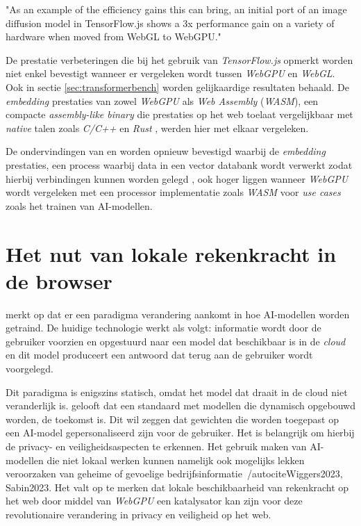 \begin{displayquote}
    "As an example of the efficiency gains this can bring, an initial port of an image diffusion model in TensorFlow.js shows a 3x performance gain on a variety of hardware when moved from WebGL to WebGPU."
\end{displayquote}

De prestatie verbeteringen die \textcite{Wallez2023} bij het gebruik van \textit{TensorFlow.js} opmerkt worden niet enkel bevestigt wanneer er vergeleken wordt tussen \textit{WebGPU} en \textit{WebGL}. Ook in sectie \ref{sec:transformerbench} worden gelijkaardige resultaten behaald. De \textit{embedding} prestaties van zowel \textit{WebGPU} als \textit{Web Assembly} (\textit{WASM}), een compacte \textit{assembly-like binary} die prestaties op het web toelaat vergelijkbaar met \textit{native} talen zoals \textit{C/C++} en \textit{Rust} \autocite{Steiner2023}, werden hier met elkaar vergeleken.

\bigbreak{}

De ondervindingen van \textcite{Wallez2023} en \textcite{Radin2021} worden opnieuw bevestigd waarbij de \textit{embedding} prestaties, een process waarbij data in een vector databank wordt verwerkt zodat hierbij verbindingen kunnen worden gelegd \autocite{Cloudflare2024, Cloudflare2024a, Huyen2023}, ook hoger liggen wanneer \textit{WebGPU} wordt vergeleken met een processor implementatie zoals \textit{WASM} voor \textit{use cases} zoals het trainen van AI-modellen.

\break{}

\section{Het nut van lokale rekenkracht in de browser} 

\textcite{Fleetwood2022} merkt op dat er een paradigma verandering aankomt in hoe AI-modellen worden getraind. De huidige technologie werkt als volgt: informatie wordt door de gebruiker voorzien en opgestuurd naar een model dat beschikbaar is in de \textit{cloud} en dit model produceert een antwoord dat terug aan de gebruiker wordt voorgelegd.

\bigbreak{}

Dit paradigma is enigszins statisch, omdat het model dat draait in de cloud niet veranderlijk is. \textcite{Fleetwood2022} gelooft dat een standaard met modellen die dynamisch opgebouwd worden, de toekomst is. Dit wil zeggen dat gewichten die worden toegepast op een AI-model gepersonaliseerd zijn voor de gebruiker. Het is belangrijk om hierbij de privacy- en veiligheidsaspecten te erkennen. Het gebruik maken van AI-modellen die niet lokaal werken kunnen namelijk ook mogelijks lekken veroorzaken van geheime of gevoelige bedrijfsinformatie~/autocite{Wiggers2023, Sabin2023}. Het valt op te merken dat lokale beschikbaarheid van rekenkracht op het web door middel van \textit{WebGPU} een katalysator kan zijn voor deze revolutionaire verandering in privacy en veiligheid op het web.

